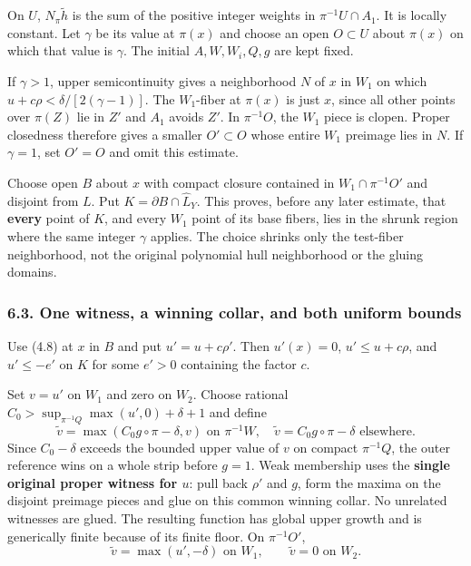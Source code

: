 \documentclass[
  10pt,
]{article}
\begin{document}
On \(U\), \(N_\pi\widetilde h\) is the sum of the positive integer
weights in \(\pi^{-1}U\cap A_1\). It is locally constant. Let \(\gamma\)
be its value at \(\pi(x)\) and choose an open \(O\subset U\) about
\(\pi(x)\) on which that value is \(\gamma\). The initial
\(A,W,W_i,Q,g\) are kept fixed.

If \(\gamma>1\), upper semicontinuity gives a neighborhood \(N\) of
\(x\) in \(W_1\) on which \(u+c\rho<\delta/[2(\gamma-1)]\). The
\(W_1\)-fiber at \(\pi(x)\) is just \(x\), since all other points over
\(\pi(Z)\) lie in \(Z'\) and \(A_1\) avoids \(Z'\). In \(\pi^{-1}O\),
the \(W_1\) piece is clopen. Proper closedness therefore gives a smaller
\(O'\subset O\) whose entire \(W_1\) preimage lies in \(N\). If
\(\gamma=1\), set \(O'=O\) and omit this estimate.

Choose open \(B\) about \(x\) with compact closure contained in
\(W_1\cap\pi^{-1}O'\) and disjoint from \(L\). Put
\(K=\partial B\cap\widehat L_Y\). This proves, before any later
estimate, that \textbf{every} point of \(K\), and every \(W_1\) point of
its base fibers, lies in the shrunk region where the same integer
\(\gamma\) applies. The choice shrinks only the test-fiber neighborhood,
not the original polynomial hull neighborhood or the gluing domains.

\subsubsection{6.3. One witness, a winning collar, and both uniform
bounds}\label{one-witness-a-winning-collar-and-both-uniform-bounds}

Use (4.8) at \(x\) in \(B\) and put \(u'=u+c\rho'\). Then \(u'(x)=0\),
\(u'\le u+c\rho\), and \(u'\le-e'\) on \(K\) for some \(e'>0\)
containing the factor \(c\).

Set \(v=u'\) on \(W_1\) and zero on \(W_2\). Choose rational
\(C_0>\sup_{\pi^{-1}Q}\max(u',0)+\delta+1\) and define
\[\widetilde v=\max(C_0g\circ\pi-\delta,v)\text{ on }\pi^{-1}W,
 \quad\widetilde v=C_0g\circ\pi-\delta\text{ elsewhere}. \tag{6.6}\]
Since \(C_0-\delta\) exceeds the bounded upper value of \(v\) on compact
\(\pi^{-1}Q\), the outer reference wins on a whole strip before \(g=1\).
Weak membership uses the \textbf{single original proper witness for
\(u\)}: pull back \(\rho'\) and \(g\), form the maxima on the disjoint
preimage pieces and glue on this common winning collar. No unrelated
witnesses are glued. The resulting function has global upper growth and
is generically finite because of its finite floor. On \(\pi^{-1}O'\),
\[\widetilde v=\max(u',-\delta)\text{ on }W_1,\qquad
 \widetilde v=0\text{ on }W_2.\]
\end{document}
